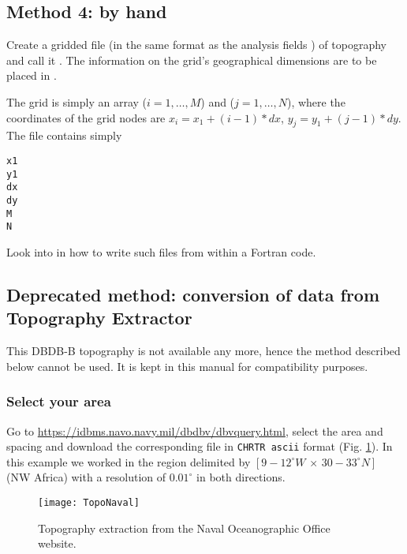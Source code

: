 \subsection{Method 4: by hand}

Create a gridded file (in the same format as the analysis fields ) of topography and call
it . The information on the grid's geographical dimensions are to be placed in .

The grid is simply an array ($i=1,\ldots,M$) and ($j=1,\ldots,N$), where the coordinates of the grid nodes are
$x_i=x_1+(i-1)*dx$, $y_j=y_1+(j-1)*dy$.  The file  contains simply
\begin{verbatim}
x1
y1
dx
dy
M
N
\end{verbatim}


Look into  in  how to write such files from within a Fortran code.




\subsection{Deprecated method: conversion of data from Topography Extractor\label{sec:toponavy}}

This DBDB-B topography is not available any more, hence the method described below cannot be used. It is kept in this manual for compatibility purposes.

\subsubsection{Select your area}

Go to \url{https://idbms.navo.navy.mil/dbdbv/dbvquery.html}, select the area and spacing and download the corresponding file in \texttt{CHRTR ascii} format (Fig. \ref{fig:topoextract}). In this example we worked in the region delimited by $[9-12^{\circ}W\, \times\, 30-33^{\circ}N]$ (NW Africa) with a resolution of $0.01^{\circ}$ in both directions. 


\begin{figure}[htpb]
\centering
\texttt{[image: TopoNaval]}
\caption{Topography extraction from the Naval Oceanographic Office website.\label{fig:topoextract}}
\end{figure}

